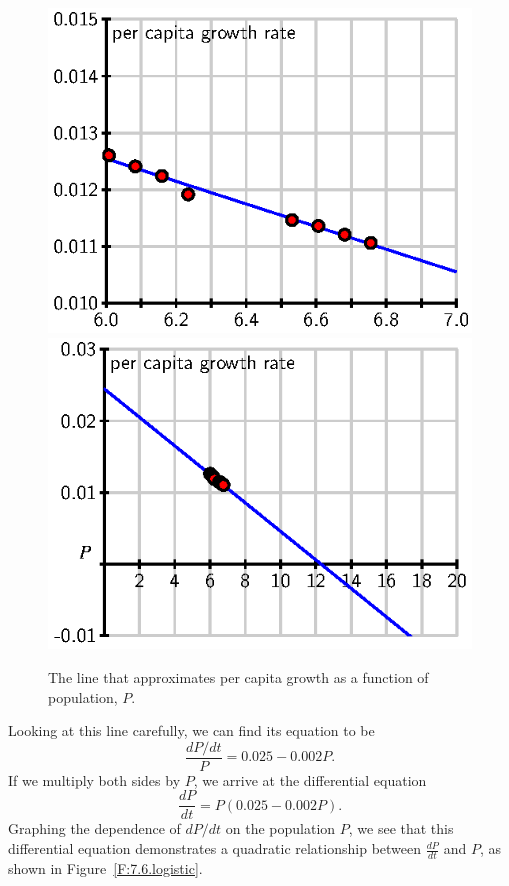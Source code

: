 \begin{figure}[h]
\begin{center}
  \includegraphics{figures/7_6_census_1.eps} \qquad
  \includegraphics{figures/7_6_census_2.eps} \qquad
\end{center}
\caption{The line that approximates per capita growth as a function of population, $P$.} \label{F:7.6.census1}
\end{figure}
Looking at this line carefully, we can find its equation to be
$$
\frac{dP/dt}{P} = 0.025 - 0.002P.
$$
If we multiply both sides by $P$, we arrive at the differential
equation
$$
\frac{dP}{dt} = P(0.025 - 0.002P).
$$
Graphing the dependence of $dP/dt$ on the population $P$, we see that this differential equation demonstrates a quadratic relationship between $\frac{dP}{dt}$ and $P$, as shown in Figure~\ref{F:7.6.logistic}.
